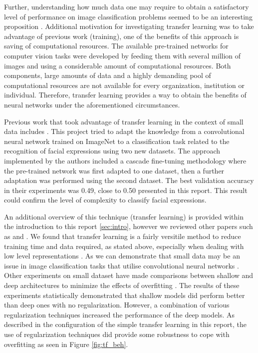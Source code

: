 \documentclass{article}
\begin{document}
Further, understanding how much data one may require to obtain a satisfactory level of performance on image classification problems seemed to be an interesting proposition \cite{howMuchData}. Additional motivation for investigating transfer learning was to take advantage of previous work (training), one of the benefits of this approach is saving of computational resources. The available pre-trained networks for computer vision tasks were developed by feeding them with several million of images and using a considerable amount of computational resources. Both components, large amounts of data and a highly demanding pool of computational resources are not available for every organization, institution or individual. Therefore, transfer learning provides a way to obtain the benefits of neural networks under the aforementioned circumstances.

Previous work that took advantage of transfer learning in the context of small data includes \citep{ng2015deep}. This project tried to adapt the knowledge from a convolutional neural network trained on ImageNet to a classification task related to the recognition of facial expressions using two new datasets. The approach implemented by the authors included a cascade fine-tuning methodology where the pre-trained network was first adapted to one dataset, then a further adaptation was performed using the second dataset. The best validation accuracy in their experiments was 0.49, close to 0.50 presented in this report. This result could confirm the level of complexity to classify facial expressions.

An additional overview of this technique (transfer learning) is provided within the introduction to this report \ref{sec:intro}, however we reviewed other papers such as \cite{NIPS2014_5347} and \cite{oquab2014learning}. We found that transfer learning is a fairly versitile method to reduce training time and data required, as stated above, especially when dealing with low level representations \cite{NIPS2014_5347}. As we can demonstrate that small data may be an issue in image classification tasks that utilise convolutional neural networks \cite{interim-report}. Other experiments on small dataset have made comparisons between shallow and deep architectures to minimize the effects of overfitting \citep{pasupa2016comparison}. The results of these experiments statistically demonstrated that shallow models did perform better than deep ones with no regularization. However, a combination of various regularization techniques increased the performance of the deep models. As described in the configuration of the simple transfer learning in this report, the use of regularization techniques did provide some robustness to cope with overfitting as seen in Figure \ref{fig:tf_beh}.
\end{document}
